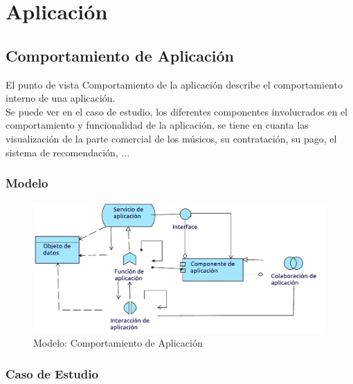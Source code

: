 \chapter{Aplicación}

\section{Comportamiento de Aplicación}
El punto de vista Comportamiento de la aplicación describe el comportamiento interno de una aplicación.\\

Se puede ver en el caso de estudio, los diferentes componentes involucrados en el comportamiento y funcionalidad de la aplicación, se tiene en cuanta las visualización de la parte comercial de los músicos, su contratación, su pago, el sistema de recomendación, ...
\subsection{Modelo}
\begin{figure}[h!]
	\centering
	\includegraphics[width=0.8\linewidth]{Arquitectura/Aplicacion/imgs/ComportamientoMetamodelo.pdf}
	\caption{Modelo: Comportamiento de Aplicación}
\end{figure}
\newpage
\subsection{Caso de Estudio}

